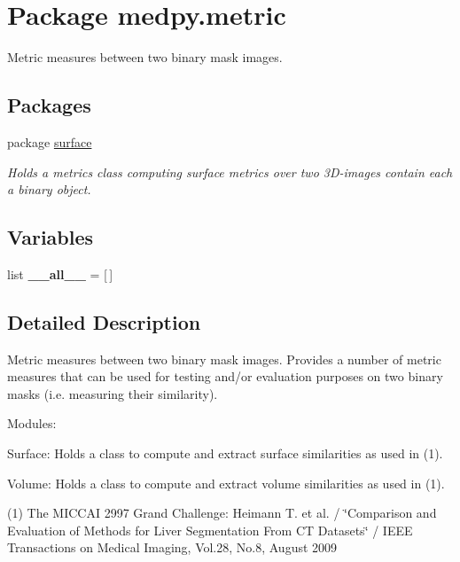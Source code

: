 \hypertarget{namespacemedpy_1_1metric}{
\section{Package medpy.metric}
\label{namespacemedpy_1_1metric}
}


Metric measures between two binary mask images.  


\subsection*{Packages}
\begin{DoxyCompactItemize}
\item 
package \hyperlink{namespacemedpy_1_1metric_1_1surface}{surface}


\begin{DoxyCompactList}\small\item\em Holds a metrics class computing surface metrics over two 3D-\/images contain each a binary object. \end{DoxyCompactList}

\end{DoxyCompactItemize}
\subsection*{Variables}
\begin{DoxyCompactItemize}
\item 
\hypertarget{namespacemedpy_1_1metric_a16520369b1c777530ed29bb33fe08cd4}{
list {\bfseries \_\-\_\-all\_\-\_\-} = \mbox{[}$\,$\mbox{]}}
\label{namespacemedpy_1_1metric_a16520369b1c777530ed29bb33fe08cd4}

\end{DoxyCompactItemize}


\subsection{Detailed Description}
Metric measures between two binary mask images. Provides a number of metric measures that can be used for testing and/or evaluation purposes on two binary masks (i.e. measuring their similarity).

Modules:
\begin{DoxyItemize}
\item Surface: Holds a class to compute and extract surface similarities as used in (1).
\item Volume: Holds a class to compute and extract volume similarities as used in (1).
\end{DoxyItemize}

(1) The MICCAI 2997 Grand Challenge: Heimann T. et al. / \char`\"{}Comparison and Evaluation of
 Methods for Liver Segmentation From CT Datasets\char`\"{} / IEEE Transactions on Medical Imaging, Vol.28, No.8, August 2009 